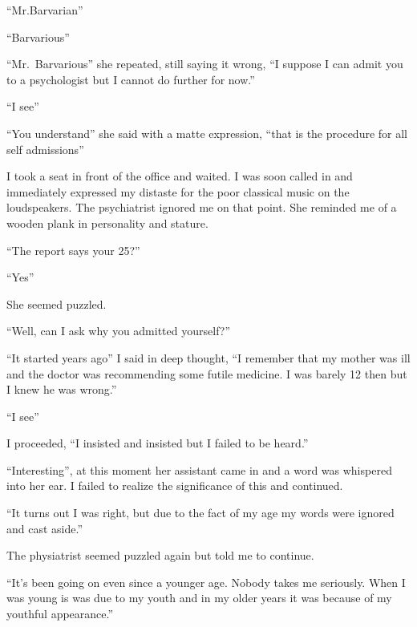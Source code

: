 ``Mr.Barvarian''



``Barvarious''



``Mr.\ Barvarious'' she repeated, still saying it wrong,
``I suppose I can admit you to a psychologist but I cannot do
further for now.''



``I see''



``You understand'' she said with a matte expression,
``that is the procedure for all self admissions''



I took a seat in front of the office and waited. I was soon called
in and immediately expressed my distaste for the poor classical
music on the loudspeakers. The psychiatrist ignored me on that
point. She reminded me of a wooden plank in personality and
stature.



``The report says your 25?''



``Yes''



She seemed puzzled.



``Well, can I ask why you admitted yourself?''



``It started years ago'' I said in deep thought, ``I
remember that my mother was ill and the doctor was recommending
some futile medicine. I was barely 12 then but I knew he was
wrong.''



``I see''



I proceeded, ``I insisted and insisted but I failed to be
heard.''



``Interesting'', at this moment her assistant came in and
a word was whispered into her ear. I failed to realize the
significance of this and continued.



``It turns out I was right, but due to the fact of my age my
words were ignored and cast aside.''



The physiatrist seemed puzzled again but told me to continue.



``It's been going on even since a younger age. Nobody
takes me seriously. When I was young is was due to my youth and in
my older years it was because of my youthful
appearance.''



